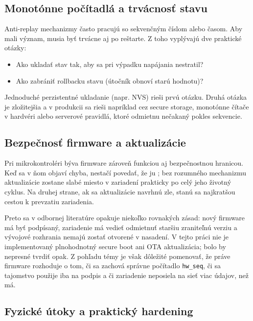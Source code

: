 \documentclass[journal,a4paper,onecolumn]{IEEEtran}
\begin{document}
\subsection{Monotónne počítadlá a trvácnosť stavu}

Anti-replay mechanizmy často pracujú so sekvenčným číslom alebo časom. Aby mali význam, musia byť trvácne aj po reštarte. Z toho vyplývajú dve praktické otázky:

\begin{itemize}[leftmargin=*,itemsep=2pt]
  \item Ako ukladať stav tak, aby sa pri výpadku napájania nestratil?
  \item Ako zabrániť rollbacku stavu (útočník obnoví starú hodnotu)?
\end{itemize}

Jednoduché perzistentné ukladanie (napr. NVS) rieši prvú otázku. Druhá otázka je zložitejšia a v produkcii sa rieši napríklad cez secure storage, monotónne čítače v hardvéri alebo serverové pravidlá, ktoré odmietnu nečakaný pokles sekvencie.

\subsection{Bezpečnosť firmware a aktualizácie}

Pri mikrokontroléri býva firmware zároveň funkciou aj bezpečnostnou hranicou. Keď sa v ňom objaví chyba, nestačí povedať, že ju ; bez rozumného mechanizmu aktualizácie zostane slabé miesto v zariadení prakticky po celý jeho životný cyklus. Na druhej strane, ak sa aktualizácie navrhnú zle, stanú sa najkratšou cestou k prevzatiu zariadenia.

Preto sa v odbornej literatúre opakuje niekoľko rovnakých zásad: nový firmware má byť podpísaný, zariadenie má vedieť odmietnuť staršiu zraniteľnú verziu a vývojové rozhrania nemajú zostať otvorené v nasadení. V tejto práci nie je implementovaný plnohodnotný secure boot ani OTA aktualizácia; bolo by nepresné tvrdiť opak. Z pohľadu témy je však dôležité pomenovať, že práve firmware rozhoduje o tom, či sa zachová správne počítadlo \texttt{hw\_seq}, či sa tajomstvo použije iba na podpis a či zariadenie neposiela na sieť viac údajov, než má.

\subsection{Fyzické útoky a praktický hardening}
\end{document}
